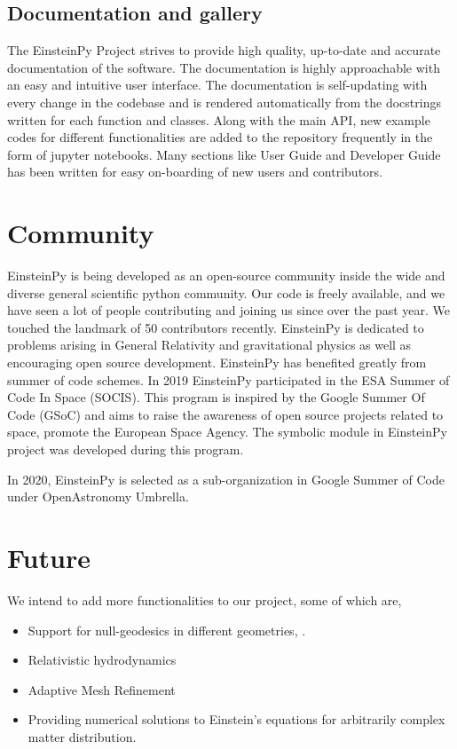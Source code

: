 \documentclass[refree]{aa}
\begin{document}
\subsection{ Documentation and gallery} \label{subsec:doc}
The EinsteinPy Project strives to provide high quality, up-to-date and accurate documentation of the software. The documentation is highly approachable with an easy and intuitive user interface. The documentation is self-updating with every change in the codebase and is rendered automatically from the docstrings written for each function and classes. Along with the main API, new example codes for different functionalities are added to the repository frequently in the form of jupyter notebooks. Many sections like User Guide and Developer Guide has been written for easy on-boarding of new users and contributors.
	
\section{Community} \label{sec:COMMUNITY}
EinsteinPy is being developed as an open-source community inside the wide and diverse general scientific python community. Our code is freely available, and we have seen a lot of people contributing and joining us since over the past year. We touched the landmark of 50 contributors recently. EinsteinPy is dedicated to problems arising in General Relativity and gravitational physics as well as encouraging open source development. EinsteinPy has benefited greatly from summer of code schemes. In 2019 EinsteinPy participated in the ESA Summer of Code In Space (SOCIS). This program is inspired by the Google Summer Of Code (GSoC) and aims to raise the awareness of open source projects related to space, promote the European Space Agency. The symbolic module in EinsteinPy project was developed during this program.

In 2020, EinsteinPy is selected as a sub-organization in Google Summer of Code under OpenAstronomy Umbrella. 

\section{Future} \label{sec:FUTURE}
We intend to add more functionalities to our project, some of which are, 
\begin{itemize}
\item Support for null-geodesics in different geometries, . 
\item Relativistic hydrodynamics
\item Adaptive Mesh Refinement 
\item Providing numerical solutions to Einstein’s equations for arbitrarily complex matter distribution.
\end{itemize}
\end{document}
